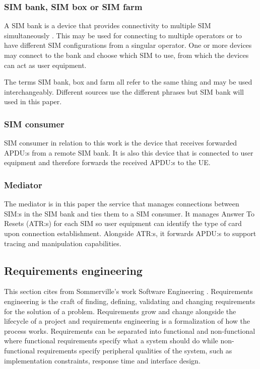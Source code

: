 \subsubsection{SIM bank, SIM box or SIM farm}

A SIM bank is a device that provides connectivity to multiple SIM
simultaneously \cite{hyprms-sim-bank}. This may be used for
connecting to multiple operators or to have different SIM
configurations from a singular operator. One or more devices may
connect to the bank and choose which SIM to use, from which the
devices can act as user equipment.

The terms SIM bank, box and farm all refer to the same thing and
may be used interchangeably. Different sources use the different
phrases but SIM bank will used in this paper.

\subsubsection{SIM consumer}

SIM consumer in relation to this work is the device that receives
forwarded APDU:s from a remote SIM bank. It is also this device
that is connected to user equipment and therefore forwards the
received APDU:s to the UE.

\subsubsection{Mediator}

The mediator is in this paper the service that manages connections
between SIM:s in the SIM bank and ties them to a SIM consumer. It
manages Answer To Resets (ATR:s) for each SIM so user equipment
can identify the type of card upon connection establishment.
Alongside ATR:s, it forwards APDU:s to support tracing and
manipulation capabilities.

\subsection{Requirements engineering}

This section cites from Sommerville's work Software Engineering \cite{sommerville-software-engineering}.
Requirements engineering is the craft of finding, defining,
validating and changing requirements for the solution of a problem.
Requirements grow and change alongside the lifecycle of a project
and requirements engineering is a formalization of how the process
works. Requirements can be separated into functional and
non-functional where functional requirements specify what a system
should do while non-functional requirements specify peripheral
qualities of the system, such as implementation constraints,
response time and interface design.

